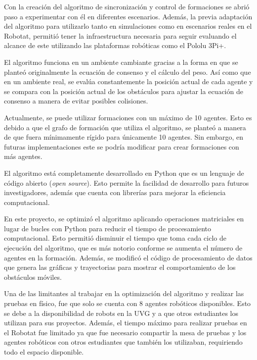 Con la creación del algoritmo de sincronización y control de formaciones se abrió paso a experimentar con él en diferentes escenarios. Además, la previa adaptación del algoritmo para utilizarlo tanto en simulaciones como en escenarios reales en el Robotat, permitió tener la infraestructura necesaria para seguir evaluando el alcance de este utilizando las plataformas robóticas como el Pololu 3Pi+. 

El algoritmo funciona en un ambiente cambiante gracias a la forma en que se planteó originalmente la ecuación de consenso y el cálculo del peso. Así como que en un ambiente real, se evalúa constantemente la posición actual de cada agente y se compara con la posición actual de los obstáculos para ajustar la ecuación de consenso a manera de evitar posibles colisiones.

Actualmente, se puede utilizar formaciones con un máximo de 10 agentes. Esto es debido a que el grafo de formación que utiliza el algoritmo, se planteó a manera de que fuera mínimamente rígido para únicamente 10 agentes. Sin embargo, en futuras implementaciones este se podría modificar para crear formaciones con más agentes.

El algoritmo está completamente desarrollado en Python que es un lenguaje de código abierto (\textit{open source}). Esto permite la facilidad de desarrollo para futuros investigadores, además que cuenta con librerías para mejorar la eficiencia computacional.

En este proyecto, se optimizó el algoritmo aplicando operaciones matriciales en lugar de bucles con Python para reducir el tiempo de procesamiento computacional. Esto permitió disminuir el tiempo que toma cada ciclo de ejecución del algoritmo, que es más notorio conforme se aumenta el número de agentes en la formación. Además, se modificó el código de procesamiento de datos que genera las gráficas y trayectorias para mostrar el comportamiento de los obstáculos móviles.

Una de las limitantes al trabajar en la optimización del algoritmo y realizar las pruebas en físico, fue que solo se cuenta con 8 agentes robóticos disponibles. Esto se debe a la disponibilidad de robots en la UVG y a que otros estudiantes los utilizan para sus proyectos. Además, el tiempo máximo para realizar pruebas en el Robotat fue limitado ya que fue necesario compartir la mesa de pruebas y los agentes robóticos con otros estudiantes que también los utilizaban, requiriendo todo el espacio disponible.
